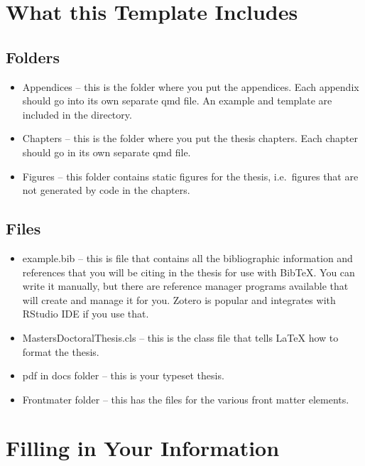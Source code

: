 \documentclass[
  letterpaper,
  11pt,
  english,
  singlespacing,
  headsepline]{MastersDoctoralThesis}
\begin{document}
\section{What this Template
Includes}\label{what-this-template-includes-1}

\subsection{Folders}\label{folders-1}

\begin{itemize}
\item
  Appendices -- this is the folder where you put the appendices. Each
  appendix should go into its own separate qmd file. An example and
  template are included in the directory.
\item
  Chapters -- this is the folder where you put the thesis chapters. Each
  chapter should go in its own separate qmd file.
\item
  Figures -- this folder contains static figures for the thesis,
  i.e.~figures that are not generated by code in the chapters.
\end{itemize}

\subsection{Files}\label{files-1}

\begin{itemize}
\item
  example.bib -- this is file that contains all the bibliographic
  information and references that you will be citing in the thesis for
  use with BibTeX. You can write it manually, but there are reference
  manager programs available that will create and manage it for you.
  Zotero is popular and integrates with RStudio IDE if you use that.
\item
  MastersDoctoralThesis.cls -- this is the class file that tells
  \LaTeX{} how to format the thesis.
\item
  pdf in docs folder -- this is your typeset thesis.
\item
  Frontmater folder -- this has the files for the various front matter
  elements.
\end{itemize}

\section{Filling in Your
Information}\label{filling-in-your-information-1}
\end{document}
